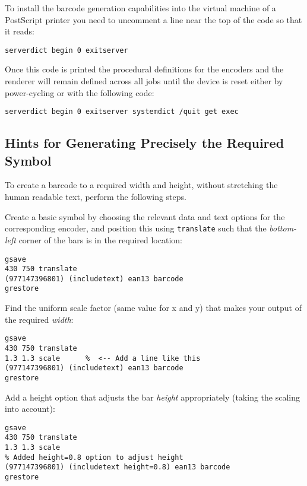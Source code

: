 \documentclass []{article}
\begin{document}
To install the barcode generation capabilities into the 
virtual machine of a PostScript printer you need to uncomment a line near the
top of the code so that it reads:

\begin{verbatim}
serverdict begin 0 exitserver
\end{verbatim}

Once this code is printed the procedural definitions for the encoders and
the renderer will remain defined across all jobs until the device is reset
either by power-cycling or with the following code:

\begin{verbatim}
serverdict begin 0 exitserver systemdict /quit get exec
\end{verbatim}

\newpage

\subsection{Hints for Generating Precisely the Required Symbol}

To create a barcode to a required width and height, without 
stretching the human readable text, perform the following steps. 

Create a basic symbol by choosing the relevant data and text options for the 
corresponding encoder, and position this using \texttt{translate} such that
the \emph{bottom-left} corner of the bars is in the required location: 

\begin{verbatim}
gsave 
430 750 translate 
(977147396801) (includetext) ean13 barcode 
grestore 
\end{verbatim}

Find the uniform scale factor (same value for x and y) that makes your output 
of the required \emph{width}: 

\begin{verbatim}
gsave 
430 750 translate 
1.3 1.3 scale      %  <-- Add a line like this 
(977147396801) (includetext) ean13 barcode 
grestore 
\end{verbatim}

Add a height option that adjusts the bar \emph{height} appropriately 
(taking the scaling into account): 

\begin{verbatim}
gsave 
430 750 translate 
1.3 1.3 scale 
% Added height=0.8 option to adjust height 
(977147396801) (includetext height=0.8) ean13 barcode 
grestore 
\end{verbatim}
\end{document}
